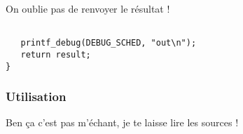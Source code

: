    On oublie pas de renvoyer le résultat !

\begin{verbatim}

   printf_debug(DEBUG_SCHED, "out\n");
   return result;
}
\end{verbatim}

%
\subsubsection{Utilisation}

   Ben ça c'est pas m'échant, je te laisse lire les sources !

